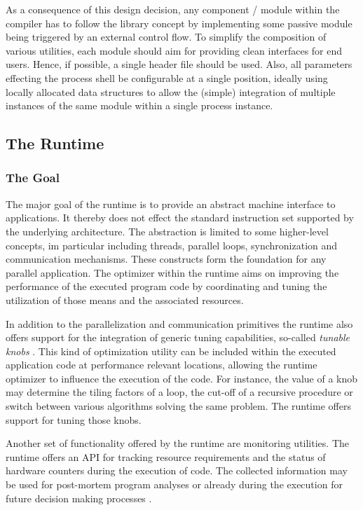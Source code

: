 As a consequence of this design decision, any component / module within the
compiler has to follow the library concept by implementing some passive module
being triggered by an external control flow. To simplify the composition of
various utilities, each module should aim for providing clean interfaces for end
users. Hence, if possible, a single header file should be used. Also, all
parameters effecting the process shell be configurable at a single position,
ideally using locally allocated data structures to allow the (simple)
integration of multiple instances of the same module within a single process
instance.


\subsection{The Runtime}

\subsubsection{The Goal}
The major goal of the runtime is to provide an abstract machine interface
to applications. It thereby does not effect the standard instruction set
supported by the underlying architecture. The abstraction is limited to some
higher-level concepts, im particular including threads, parallel loops,
synchronization and communication mechanisms. These constructs form the
foundation for any parallel application. The optimizer within the runtime 
aims on improving the performance of the executed program code by coordinating
and tuning the utilization of those means and the associated resources.

In addition to the parallelization and communication primitives the runtime also offers support for the integration of generic tuning capabilities, so-called \textit{tunable knobs}  . This kind of optimization utility can be included within the
executed application code at performance relevant locations, allowing the
runtime optimizer to influence the execution of the code. For instance, the
value of a knob may determine the tiling factors of a loop, the cut-off of a
recursive procedure or switch between various algorithms solving the same
problem. The runtime offers support for tuning those knobs. 

Another set of functionality offered by the runtime are monitoring utilities.
The runtime offers an API for tracking resource requirements and the status of
hardware counters during the execution of code. The collected information may be
used for post-mortem program analyses or already during the execution for future
decision making processes .

